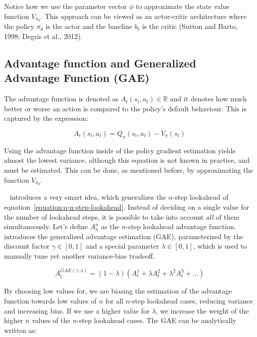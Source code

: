 \documentclass{../main.tex}{}
\begin{document}
Notice how we use the parameter vector $\phi$ to approximate the state value function $V_{\pi_{\theta}}$. This approach can be viewed as an actor-critic architecture where the policy $\pi_{\theta}$ is the actor and the baseline $b_t$ is the critic (Sutton and Barto, 1998; Degris et al., 2012).

\subsection{Advantage function and Generalized Advantage Function (GAE)}

The advantage function is denoted as $A_{t}(s_t, a_t) \in \mathbb{R}$ and it denotes how much better or worse an action is compared to the policy's default behaviour. This is captured by the expression:

\begin{equation}
A_{t}(s_t, a_t) = Q_{\pi}(s_t, a_t) - V_{\pi}(s_t)
\end{equation}

Using the advantage function inside of the policy gradient estimation yields almost the lowest variance, although this equation is not known in practice, and must be estimated. This can be done, as mentioned before, by approximating the function $V_{\pi_{\theta}}$.

~\cite{Schulman2015a} introduces a very smart idea, which generalizes the $n$-step lookahead of equation~\ref{equation:q-n-step-lookahead}. Instead of deciding on a single value for the number of lookahead steps, it is possible to take into account \textit{all} of them simultaneously. Let's define $A^n_{\pi}$ as the $n$-step lookahead advantage function. \citep{Schulman2015a} introduces the generalized advantage estimation (GAE), parameterized by the discount factor $\gamma \in [0,1]$ and a special parameter $\lambda \in [0,1]$, which is used to manually tune yet another variance-bias tradeoff.

\begin{equation}
    A^{GAE(\gamma, \lambda)}_{t} = (1 - \lambda) (A^1_{t} + \lambda A^2_{t} + \lambda^2 A^3_{t} + \dots)
\end{equation}


By choosing low values for, we are biasing the estimation of the advantage function towards low values of $n$ for all $n$-step lookahead cases, reducing variance and increasing bias. If we use a higher value for $\lambda$, we increase the weight of the higher $n$ values of the $n$-step lookahead cases. The GAE can be analytically written as:
\end{document}
